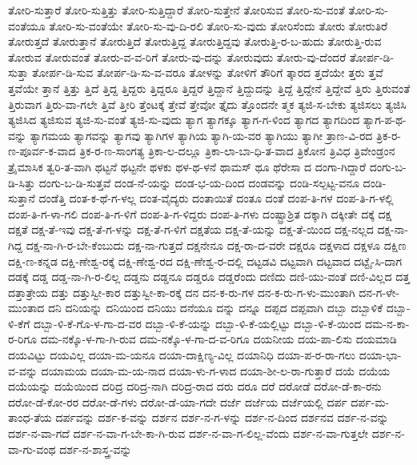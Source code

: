 {ತೋರಿ-ಸುತ್ತಾರೆ
ತೋರಿ-ಸುತ್ತಿತ್ತು
ತೋರಿ-ಸುತ್ತಿದ್ದಾರೆ
ತೋರಿ-ಸುತ್ತೇನೆ
ತೋರಿಸುವ
ತೋರಿ-ಸು-ವಂತೆ
ತೋರಿ-ಸು-ವಂತೆಯೂ
ತೋರಿ-ಸು-ವಂತೆಯೇ
ತೋರಿ-ಸು-ವು-ದಿ-ರಲಿ
ತೋರಿ-ಸು-ವುದು
ತೋರಿಸೆಂದು
ತೋರು
ತೋರುತಿರೆ
ತೋರುತ್ತದೆ
ತೋರುತ್ತಾನೆ
ತೋರುತ್ತಿದೆ
ತೋರುತ್ತಿದ್ದ
ತೋರುತ್ತಿದ್ದವು
ತೋರುತ್ತಿ-ರ-ಬ-ಹುದು
ತೋರುತ್ತಿ-ರುವ
ತೋರುವ
ತೋರುವಂತೆ
ತೋರು-ವ-ವ-ರಿಗೆ
ತೋರು-ವು-ದನ್ನು
ತೋರುವುದು
ತೋರು-ವು-ದೆಂದರೆ
ತೋರ್ಪ-ಡಿ-ಸುತ್ತಾ
ತೋರ್ಪ-ಡಿ-ಸುವ
ತೋರ್ಪ-ಡಿ-ಸು-ವ-ವರೂ
ತೋಳನ್ನು
ತೋಳಿಗೆ
ತೌರಿಗೆ
ತ್ಕಾರದ
ತ್ತದೆಯೇ
ತ್ತರು
ತ್ತವೆ
ತ್ತವೆಯೇ
ತ್ತಾನೆ
ತ್ತಿತ್ತು
ತ್ತಿದೆ
ತ್ತಿದ್ದ
ತ್ತಿದ್ದರು
ತ್ತಿದ್ದರೂ
ತ್ತಿದ್ದರೆ
ತ್ತಿದ್ದಾನೆ
ತ್ತಿದ್ದುದನ್ನು
ತ್ತಿದ್ದೆ
ತ್ತಿದ್ದೇನೆ
ತ್ತಿದ್ದೇವೆ
ತ್ತಿರು
ತ್ತಿರುವಂತೆ
ತ್ತಿರುವಾಗ
ತ್ತಿರು-ವಾ-ಗಲೇ
ತ್ತಿವೆ
ತ್ತೀರಿ
ತ್ತೆಂಟಕ್ಕೆ
ತ್ತೇವೆ
ತ್ತೇವೋ
ತ್ತೈದು
ತ್ತೊಂದನೇ
ತ್ಮಕ
ತ್ಯಜಿ-ಸ-ಬೇಕು
ತ್ಯಜಿಸಲು
ತ್ಯಜಿಸಿ
ತ್ಯಜಿಸಿದ
ತ್ಯಜಿಸುವ
ತ್ಯಜಿ-ಸು-ವಂತೆ
ತ್ಯಜಿ-ಸು-ವುದು
ತ್ಯಾಗ
ತ್ಯಾಗಕ್ಕೂ
ತ್ಯಾಗ-ಗ-ಳಿಂದ
ತ್ಯಾಗದ
ತ್ಯಾಗದಿಂದ
ತ್ಯಾಗ-ಪ-ಥ-ವನ್ನು
ತ್ಯಾಗಮಯ
ತ್ಯಾಗವನ್ನು
ತ್ಯಾಗವು
ತ್ಯಾಗಿಗಳ
ತ್ಯಾಗಿಯ
ತ್ಯಾಗಿ-ಯ-ವರ
ತ್ಯಾಗಿಯು
ತ್ಯಾಗೀ
ತ್ರಾಣ-ವಿ-ರದ
ತ್ರಿಕ-ರ-ಣ-ಪೂರ್ವ-ಕ-ವಾದ
ತ್ರಿಕ-ರ-ಣ-ಸಾಂಗತ್ಯ
ತ್ರಿಕಾ-ಲ-ದಲ್ಲೂ
ತ್ರಿಕಾ-ಲಾ-ಬಾ-ಧಿ-ತ-ವಾದ
ತ್ರಿಕೋನ
ತ್ರಿವಿಧ
ತ್ರಿವೇಂಡ್ರಂನ
ತ್ರೈಮಾಸಿಕ
ತ್ವರಿ-ತ-ವಾಗಿ
ಥಟ್ಟನೆ
ಥಟ್ಟನೇ
ಥಳಕು
ಥಳ-ಥ-ಳನೆ
ಥಾಮಸ್
ಥೂ
ಥೆರೇಸಾ
ದ
ದಂಗಾ-ಗಿದ್ದಾರೆ
ದಂಗು-ಬ-ಡಿ-ಸಿತ್ತು
ದಂಗು-ಬ-ಡಿ-ಸುತ್ತವೆ
ದಂಡ-ನೆ-ಯನ್ನು
ದಂಡ-ಭ-ಯ-ದಿಂದ
ದಂಡವನ್ನು
ದಂಡಿ-ಸಲ್ಪಟ್ಟ-ವನೂ
ದಂಡಿ-ಸುತ್ತಾನೆ
ದಂಡೆತ್ತಿ
ದಂತ-ಕ-ಥೆ-ಗ-ಳಲ್ಲ
ದಂತ-ವೈದ್ಯರು
ದಂತಾಯಿತೆ
ದಂತೂ
ದಂತೆ
ದಂಪ-ತಿ-ಗಳ
ದಂಪ-ತಿ-ಗ-ಳಲ್ಲಿ
ದಂಪ-ತಿ-ಗ-ಳಾ-ಗಲಿ
ದಂಪ-ತಿ-ಗ-ಳಿಗೆ
ದಂಪ-ತಿ-ಗ-ಳಿದ್ದರು
ದಂಪ-ತಿ-ಗಳು
ದಂಷ್ಟ್ರಾಶ್ರಿತ
ದಕ್ಕಾಗಿ
ದಕ್ಕೀತೇ
ದಕ್ಕೆ
ದಕ್ಷ
ದಕ್ಷತೆ
ದಕ್ಷ-ತೆ-ಇವು
ದಕ್ಷ-ತೆ-ಗ-ಳನ್ನು
ದಕ್ಷ-ತೆ-ಗ-ಳಿಗೆ
ದಕ್ಷತೆಯ
ದಕ್ಷ-ತೆ-ಯನ್ನು
ದಕ್ಷ-ತೆ-ಯಿಂದ
ದಕ್ಷ-ನಲ್ಲದ
ದಕ್ಷ-ನಾ-ಗಿದ್ದ
ದಕ್ಷ-ನಾ-ಗಿ-ರ-ಬೇ-ಕೆಂಬುದು
ದಕ್ಷ-ನಾ-ಗುತ್ತದೆ
ದಕ್ಷನೇನೂ
ದಕ್ಷ-ರಾ-ದ-ವರೇ
ದಕ್ಷರೂ
ದಕ್ಷಳಾದ
ದಕ್ಷಳೂ
ದಕ್ಷಿಣ
ದಕ್ಷಿ-ಣ-ಕನ್ನಡ
ದಕ್ಷಿ-ಣೇಶ್ವ-ರಕ್ಕೆ
ದಕ್ಷಿ-ಣೇಶ್ವ-ರದ
ದಕ್ಷಿ-ಣೇಶ್ವ-ರ-ದಲ್ಲಿ
ದಟ್ಟಡವಿ
ದಟ್ಟವಾಗಿ
ದಟ್ಟವಾದ
ದಟ್ಟೈ-ಸಿ-ದಾಗ
ದಡಕ್ಕೆ
ದಡ್ಡ
ದಡ್ಡ-ನಾ-ಗಿ-ರ-ಲಿಲ್ಲ
ದಡ್ಡನು
ದಡ್ಡನೂ
ದಡ್ಡರೂ
ದಡ್ಡರೆಂದು
ದಣಿದು
ದಣಿ-ಯು-ವಂತೆ
ದಣಿ-ವಿಲ್ಲದ
ದತ್ತ
ದತ್ತಾತ್ರೇಯ
ದತ್ತು
ದತ್ತುಸ್ವೀ-ಕಾರ
ದತ್ತುಸ್ವೀ-ಕಾ-ರಕ್ಕೆ
ದನ
ದನ-ಕ-ರು-ಗಳ
ದನ-ಕ-ರು-ಗ-ಳು-ಮುಂತಾಗಿ
ದನ-ಗ-ಳೇ-ಮುಂತಾದ
ದನಿ
ದನಿಯನ್ನು
ದನಿಯಿಂದ
ದನಿಯು
ದನೆಯೂ
ದನ್ನು
ದನ್ನೂ
ದಪ್ಪದ
ದಪ್ಪವಾಗಿ
ದಬ್ಬಾ
ದಬ್ಬಾಳಿಕೆ
ದಬ್ಬಾ-ಳಿ-ಕೆಗೆ
ದಬ್ಬಾ-ಳಿ-ಕೆ-ಗೊ-ಳ-ಗಾ-ದ-ವರ
ದಬ್ಬಾ-ಳಿ-ಕೆ-ಯನ್ನು
ದಬ್ಬಾ-ಳಿ-ಕೆ-ಯಲ್ಲಿಟ್ಟು
ದಬ್ಬಾ-ಳಿ-ಕೆ-ಯಿಂದ
ದಮ-ನ-ಕಾ-ರ-ರಿಗೂ
ದಮ-ನಕ್ಕೊ-ಳ-ಗಾ-ಗಿ-ರುವ
ದಮ-ನಕ್ಕೊ-ಳ-ಗಾ-ದ-ವ-ರಿಗೂ
ದಯನೀಯ
ದಯ-ಪಾ-ಲಿಸು
ದಯಮಾಡಿ
ದಯವಿಟ್ಟು
ದಯವಿಲ್ಲ
ದಯಾ-ಮ-ಯನೂ
ದಯಾ-ದಾಕ್ಷಿಣ್ಯ-ವಿಲ್ಲ
ದಯಾನಿಧಿ
ದಯಾ-ಪ-ರ-ರಾ-ಗಲು
ದಯಾ-ಭಾ-ವ-ವನ್ನು
ದಯಾಮಯ
ದಯಾ-ಮ-ಯ-ನಾದ
ದಯಾ-ಳು-ಗ-ಳಾದ
ದಯಾ-ಶೀ-ಲ-ರಾ-ಗುತ್ತಾರೆ
ದಯೆ
ದಯೆಯ
ದಯೆಯನ್ನು
ದಯೆಯಿಂದ
ದರಿದ್ರ
ದರಿದ್ರ-ನಾಗಿ
ದರಿದ್ರ-ರಾದ
ದರು
ದರೂ
ದರೆ
ದರೋಡೆ
ದರೋ-ಡೆ-ಕಾ-ರನು
ದರೋ-ಡೆ-ಕೋ-ರರ
ದರೋ-ಡೆ-ಗಳು
ದರೋ-ಡೆ-ಯಾ-ಗದೇ
ದರ್ಜೆ
ದರ್ಜೆಯ
ದರ್ಜೆಯಲ್ಲಿ
ದರ್ಪ
ದರ್ಪ-ಮ-ತಾಂಧ-ತೆಯ
ದರ್ಪವನ್ನು
ದರ್ಶ-ಕ-ವನ್ನು
ದರ್ಶನ
ದರ್ಶ-ನ-ಗ-ಳನ್ನು
ದರ್ಶ-ನ-ದಿಂದ
ದರ್ಶನವ
ದರ್ಶ-ನ-ವನ್ನು
ದರ್ಶ-ನ-ವಾ-ಗದೆ
ದರ್ಶ-ನ-ವಾ-ಗ-ಬೇ-ಕಾ-ಗಿ-ರುವ
ದರ್ಶ-ನ-ವಾ-ಗ-ಲಿಲ್ಲ-ವೆಂದು
ದರ್ಶ-ನ-ವಾ-ಗುತ್ತಲೇ
ದರ್ಶ-ನ-ವಾ-ಗು-ವಂಥ
ದರ್ಶ-ನ-ಶಾಸ್ತ್ರ-ವನ್ನು
}
